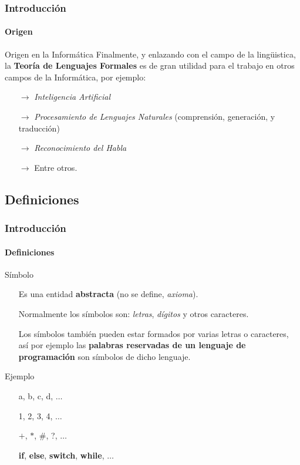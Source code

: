 \documentclass{beamer}
\begin{document}
        \begin{frame}
            \frametitle{Introducci\'on}
            \framesubtitle{Origen}

            \begin{alertblock}{Origen en la Inform\'atica}
                Finalmente, y enlazando con el campo de la ling\"uistica, la \textbf{Teor\'ia de Lenguajes Formales} es de gran utilidad para el trabajo en otros campos de la Inform\'atica, por ejemplo:
                \begin{itemize}
                    \item[$\rightarrow$] \emph{Inteligencia Artificial}
                    \item[$\rightarrow$] \emph{Procesamiento de Lenguajes Naturales} (comprensi\'on, generaci\'on, y traducci\'on)
                    \item[$\rightarrow$] \emph{Reconocimiento del Habla}
                    \item[$\rightarrow$] Entre otros.
                \end{itemize}
			\end{alertblock}
		\end{frame}
		
		\subsection{Definiciones}

        \begin{frame}
            \frametitle{Introducci\'on}
            \framesubtitle{Definiciones}

            \begin{block}{S\'imbolo}
                \begin{itemize}
                    \item[\checkmark] Es una entidad \textbf{abstracta} (no se define, \emph{axioma}).
                    \item[\checkmark] Normalmente los s\'imbolos son: \emph{letras}, \emph{d\'igitos} y otros caracteres.
                    \item[\checkmark] Los s\'imbolos tambi\'en pueden estar formados por varias letras o caracteres, as\'i por ejemplo las \textbf{palabras reservadas de un lenguaje de programaci\'on} son s\'imbolos de dicho lenguaje.
                \end{itemize}
			\end{block}
			\begin{exampleblock}{Ejemplo}
                \begin{itemize}
                    \item[\checkmark] a, b, c, d, $\ldots$
                    \item[\checkmark] 1, 2, 3, 4, $\ldots$
                    \item[\checkmark] $+$, $*$, \#, ?, $\ldots$
                    \item[\checkmark] \textbf{if}, \textbf{else}, \textbf{switch}, \textbf{while}, $\ldots$
                \end{itemize}
			\end{exampleblock}
		\end{frame}
\end{document}
